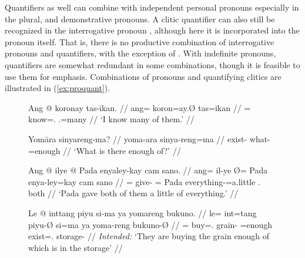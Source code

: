 Quantifiers as well can combine with independent personal pronouns especially
in the plural, and demonstrative pronouns. A clitic quantifier can also still
be recognized in the interrogative pronoun ,
although here it is incorporated into the pronoun itself. That is, there is no
productive combination of interrogative pronouns and quantifiers, with the
exception of . With indefinite pronouns, quantifiers are
somewhat redundant in some combinations, though it is feasible to use them for
emphasis. Combinations of pronouns and quantifying clitics are illustrated in
(\ref{ex:proquant}).

\begin{figure}
\pex\label{ex:proquant}
\a\label{ex:proquant_perspro}\begingl
	\gla Ang @ koronay tas-ikan. //
	\glb ang= koron=ay.Ø tas=ikan //
	\glc \AgtT{}= know=\Fsg{}.\Top{} \TplM{}.\Parg{}=many //
	\glft `I know many of them.' //
\endgl


\a\label{ex:proquant_interpro}\begingl
	\gla Yomāra sinyareng-ma? //
	\glb yoma-ara sinya-reng=ma //
	\glc exist-\TsgI{} what-\AargI{}=enough //
	\glft `What is there enough of?' //
\endgl

\a\label{ex:proquant_indefpro_1}\begingl
	\gla Ang @ ilye {} @ Pada enyaley-kay cam sano. //
	\glb ang= il-ye Ø= Pada enya-ley=kay cam sano //
	\glc \Aarg{}= give-\TsgF{} \Top{}= Pada everything-\PargI{}=a.little 
		\TplM{}.\Dat{} both //
	\glft `Pada gave both of them a little of everything.' //
\endgl


\a\label{ex:proquant_relpro}\ljudge*\begingl
	\gla Le @ inttang piyu si-ma ya yomareng bukuno. //
	\glb le= int=tang piyu-Ø si=ma ya yoma-reng bukuno-Ø //
	\glc \PargI{}= buy=\TplM{}.\Aarg{} grain-\Top{} \Rel{}=enough \LocT{}
	exist=\TsgI{}.\Aarg{} storage-\Top{} //
	\glft \textit{Intended:} `They are buying the grain enough of which is 
		in the storage' //
\endgl

\xe
\end{figure}

